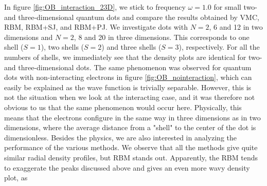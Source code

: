 In figure \eqref{fig:OB_interaction_23D}, we stick to frequency $\omega=1.0$ for small two- and three-dimensional quantum dots and compare the results obtained by VMC, RBM, RBM+SJ, and RBM+PJ. We investigate dots with $N=2$, 6 and 12 in two dimensions and $N=2$, 8 and 20 in three dimensions. This corresponds to one shell ($S=1$), two shells ($S=2$) and three shells ($S=3$), respectively. For all the numbers of shells, we immediately see that the density plots are identical for two- and three-dimensional dots. The same phenomenon was observed for quantum dots with non-interacting electrons in figure \eqref{fig:OB_nointeraction}, which can easily be explained as the wave function is trivially separable. However, this is not the situation when we look at the interacting case, and it was therefore not obvious to us that the same phenomenon would occur here. Physically, this means that the electrons configure in the same way in three dimensions as in two dimensions, where the average distance from a "shell" to the center of the dot is dimensionless. Besides the physics, we are also interested in analyzing the performance of the various methods. We observe that all the methods give quite similar radial density profiles, but RBM stands out. Apparently, the RBM tends to exaggerate the peaks discussed above and gives an even more wavy density plot, as 
